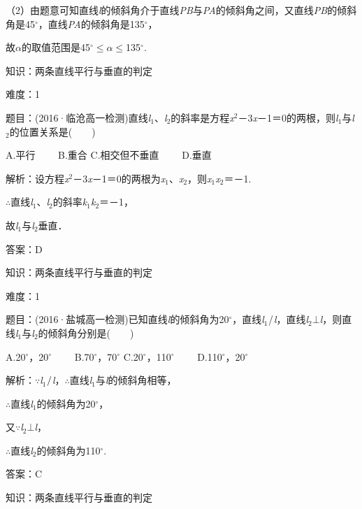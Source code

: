 \documentclass{article} %
\begin{document}
（2）由题意可知直线\textit{l}的倾斜角介于直线\textit{PB}与\textit{PA}的倾斜角之间，又直线\textit{PB}的倾斜角是45$\mathrm{{}^\circ}$，直线\textit{PA}的倾斜角是135$\mathrm{{}^\circ}$，

故\textit{$\alpha$}的取值范围是45$\mathrm{{}^\circ}$$\mathrm{\le}$\textit{$\alpha$}$\mathrm{\le}$135$\mathrm{{}^\circ}$.






知识：两条直线平行与垂直的判定

难度：1

题目：(2016·临沧高一检测)直线\textit{l}${}_{1}$、\textit{l}${}_{2}$的斜率是方程\textit{x}${}^{2}$－3\textit{x}－1＝0的两根，则\textit{l}${}_{1}$与\textit{l}${}_{2}$的位置关系是(　　)

A.平行　　 B.重合 C.相交但不垂直　　 D.垂直

解析：设方程\textit{x}${}^{2}$－3\textit{x}－1＝0的两根为\textit{x}${}_{1}$、\textit{x}${}_{2}$，则\textit{x}${}_{1}$\textit{x}${}_{2}$＝－1.

$\mathrm{\therefore}$直线\textit{l}${}_{1}$、\textit{l}${}_{2}$的斜率\textit{k}${}_{1}$\textit{k}${}_{2}$＝－1，

故\textit{l}${}_{1}$与\textit{l}${}_{2}$垂直．

答案：D

知识：两条直线平行与垂直的判定

难度：1

题目：(2016·盐城高一检测)已知直线\textit{l}的倾斜角为20$\mathrm{{}^\circ}$，直线\textit{l}${}_{1}$$\mathrm{\//}$\textit{l}，直线\textit{l}${}_{2}$$\mathrm{\bot}$\textit{l}，则直线\textit{l}${}_{1}$与\textit{l}${}_{2}$的倾斜角分别是(　　)

A.20$\mathrm{{}^\circ}$，20$\mathrm{{}^\circ}$　　 B.70$\mathrm{{}^\circ}$，70$\mathrm{{}^\circ}$ C.20$\mathrm{{}^\circ}$，110$\mathrm{{}^\circ}$　　 D.110$\mathrm{{}^\circ}$，20$\mathrm{{}^\circ}$

解析：$\mathrm{\because}$\textit{l}${}_{1}$$\mathrm{\//}$\textit{l}，$\mathrm{\therefore}$直线\textit{l}${}_{1}$与\textit{l}的倾斜角相等，

$\mathrm{\therefore}$直线\textit{l}${}_{1}$的倾斜角为20$\mathrm{{}^\circ}$，

又$\mathrm{\because}$\textit{l}${}_{2}$$\mathrm{\bot}$\textit{l}，

$\mathrm{\therefore}$直线\textit{l}${}_{2}$的倾斜角为110$\mathrm{{}^\circ}$.

答案：C

知识：两条直线平行与垂直的判定
\end{document}
